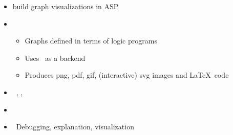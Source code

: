 \begin{frame}{\clingraph}
  \begin{itemize}
    \item {} build graph visualizations in ASP
    \item {}
      \begin{itemize}
      \item Graphs defined in terms of logic programs %
      \item Uses \graphviz\ as a backend
      \item Produces png, pdf, gif, (interactive) svg images and \LaTeX\ code
      \end{itemize}
    \item {}   \ \clingo, \clorm, \graphviz
    \item {}   \ \cite{hasascst22a}
    \item {} \ Debugging, explanation, visualization %
  \end{itemize}
\end{frame}
%
